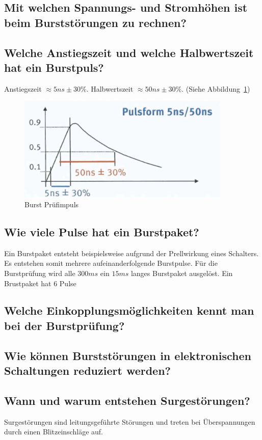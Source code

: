 \begin{itemize}
\subsection{Mit welchen Spannungs- und Stromhöhen ist beim Burststörungen zu rechnen?}

\subsection{Welche Anstiegszeit und welche Halbwertszeit hat ein Burstpuls?}
Anstiegszeit \(\approx 5ns \pm 30\%\). Halbwertszeit \(\approx 50ns \pm 30\%\). (Siehe Abbildung~\ref{fig:lv4:burst_impuls})

\begin{figure}
  \centering
  \includegraphics[height=5cm]{src/assets/pictures/lv4_burst_impuls.png}
  \caption{Burst Prüfimpuls}\label{fig:lv4:burst_impuls}
\end{figure}

\subsection{Wie viele Pulse hat ein Burstpaket?}
Ein Burstpaket entsteht beispielsweise aufgrund der Prellwirkung eines Schalters. Es entstehen somit mehrere aufeinanderfolgende Burstpulse.\p
Für die Burstprüfung wird alle \(300ms\) ein \(15ms\) langes Burstpaket ausgelöst. Ein Brustpaket hat \(6\) Pulse

\subsection{Welche Einkopplungsmöglichkeiten kennt man bei der Burstprüfung?}

\subsection{Wie können Burststörungen in elektronischen Schaltungen reduziert werden?}

\subsection{Wann und warum entstehen Surgestörungen?}
Surgestörungen sind leitungsgeführte Störungen und treten bei Überspannungen durch einen Blitzeinschläge auf.


\end{itemize}
